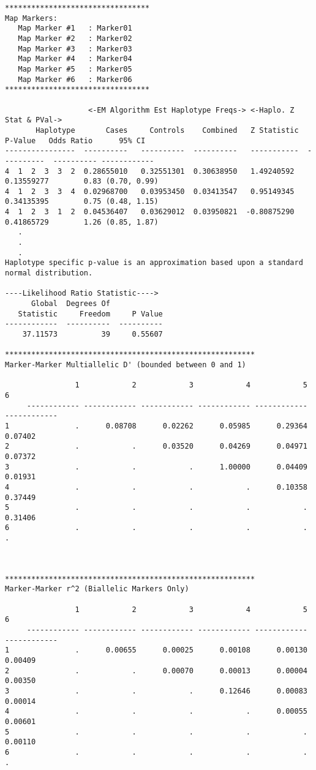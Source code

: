 \begin{verbatim}
*********************************
Map Markers: 
   Map Marker #1   : Marker01
   Map Marker #2   : Marker02
   Map Marker #3   : Marker03
   Map Marker #4   : Marker04
   Map Marker #5   : Marker05
   Map Marker #6   : Marker06
*********************************

                   <-EM Algorithm Est Haplotype Freqs-> <-Haplo. Z Stat & PVal->
       Haplotype       Cases     Controls    Combined   Z Statistic    P-Value   Odds Ratio      95% CI
----------------  ----------   ----------  ----------   -----------  ----------  ---------- ------------
4  1  2  3  3  2  0.28655010   0.32551301  0.30638950   1.49240592   0.13559277        0.83 (0.70, 0.99)
4  1  2  3  3  4  0.02968700   0.03953450  0.03413547   0.95149345   0.34135395        0.75 (0.48, 1.15)
4  1  2  3  1  2  0.04536407   0.03629012  0.03950821  -0.80875290   0.41865729        1.26 (0.85, 1.87)
   .
   .
   .
Haplotype specific p-value is an approximation based upon a standard normal distribution.

----Likelihood Ratio Statistic---->
      Global  Degrees Of            
   Statistic     Freedom     P Value
------------  ----------  ----------
    37.11573          39     0.55607

*********************************************************
Marker-Marker Multiallelic D' (bounded between 0 and 1)

                1            2            3            4            5            6
     ------------ ------------ ------------ ------------ ------------ ------------
1               .      0.08708      0.02262      0.05985      0.29364      0.07402
2               .            .      0.03520      0.04269      0.04971      0.07372
3               .            .            .      1.00000      0.04409      0.01931
4               .            .            .            .      0.10358      0.37449
5               .            .            .            .            .      0.31406
6               .            .            .            .            .            .



*********************************************************
Marker-Marker r^2 (Biallelic Markers Only)

                1            2            3            4            5            6
     ------------ ------------ ------------ ------------ ------------ ------------
1               .      0.00655      0.00025      0.00108      0.00130      0.00409
2               .            .      0.00070      0.00013      0.00004      0.00350
3               .            .            .      0.12646      0.00083      0.00014
4               .            .            .            .      0.00055      0.00601
5               .            .            .            .            .      0.00110
6               .            .            .            .            .            .
\end{verbatim}

